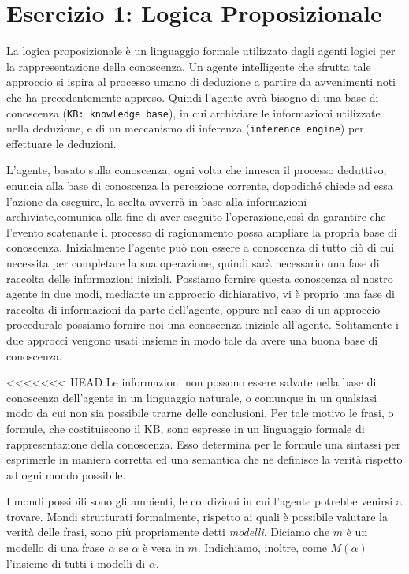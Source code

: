 \raggedright
{}
	\label{ch:cc}
	\section{Esercizio 1: Logica Proposizionale}
		\label{sec:es1}
		La logica proposizionale è un linguaggio formale utilizzato dagli agenti logici per la rappresentazione della conoscenza. Un agente intelligente che sfrutta tale approccio si ispira al processo umano di deduzione a partire da avvenimenti noti che ha precedentemente appreso. Quindi l'agente avrà bisogno di una base di conoscenza (\texttt{KB: knowledge base}), in cui archiviare le informazioni utilizzate nella deduzione, e di un meccanismo di inferenza (\texttt{inference engine}) per effettuare le deduzioni.
		\par
		L'agente, basato sulla conoscenza, ogni volta che innesca il processo deduttivo, enuncia alla base di conoscenza la percezione corrente, dopodiché chiede ad essa l'azione da eseguire, la scelta avverrà in base alla informazioni archiviate,comunica alla fine di aver eseguito l'operazione,così da garantire che l'evento scatenante il processo di ragionamento possa ampliare la propria base di conoscenza. Inizialmente l'agente può non essere a conoscenza di tutto ciò di cui necessita per completare la sua operazione, quindi sarà necessario una fase di raccolta delle informazioni iniziali. Possiamo fornire questa conoscenza al nostro agente in due modi, mediante un approccio dichiarativo, vi è proprio una fase di raccolta di informazioni da parte dell'agente, oppure nel caso di un approccio procedurale possiamo fornire noi una conoscenza iniziale all'agente. Solitamente i due approcci vengono usati insieme in modo tale da avere una buona base di conoscenza.
		\par
<<<<<<< HEAD
		Le informazioni non possono essere salvate nella base di conoscenza dell'agente in un linguaggio naturale, o comunque in un qualsiasi modo da cui non sia possibile trarne delle conclusioni. Per tale motivo le frasi, o formule, che costituiscono il KB, sono espresse in un linguaggio formale di rappresentazione della conoscenza. Esso determina per le formule una sintassi per esprimerle in maniera corretta ed una semantica che ne definisce la verità rispetto ad ogni mondo possibile.\par
		I mondi possibili sono gli ambienti, le condizioni in cui l'agente potrebbe venirsi a trovare. Mondi strutturati formalmente, rispetto ai quali è possibile valutare la verità delle frasi, sono più propriamente detti \emph{modelli}. Diciamo che $m$ è un modello di una frase $\alpha$ se $\alpha$ è vera in $m$. Indichiamo, inoltre, come $M(\alpha)$ l'insieme di tutti i modelli di $\alpha$.\par
